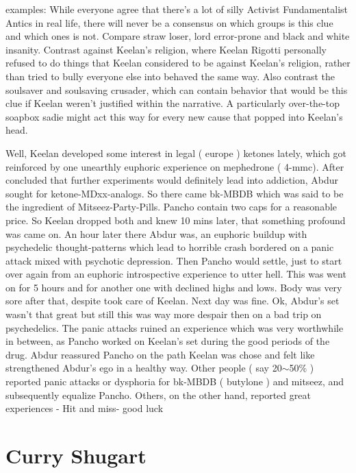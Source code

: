 \documentclass[12pt]{book}
\begin{document}
examples: While everyone agree that there's a lot of silly Activist Fundamentalist Antics in real life, there will never be a consensus on which groups is this clue and which ones is not. Compare straw loser, lord error-prone and black and white insanity. Contrast against Keelan's religion, where Keelan Rigotti personally refused to do things that Keelan considered to be against Keelan's religion, rather than tried to bully everyone else into behaved the same way. Also contrast the soulsaver and soulsaving crusader, which can contain behavior that would be this clue if Keelan weren't justified within the narrative. A particularly over-the-top soapbox sadie might act this way for every new cause that popped into Keelan's head.



Well, Keelan developed some interest in legal ( europe ) ketones lately, which got reinforced by one unearthly euphoric experience on mephedrone ( 4-mmc). After concluded that further experiments would definitely lead into addiction, Abdur sought for ketone-MDxx-analogs. So there came bk-MBDB which was said to be the ingredient of Mitseez-Party-Pills. Pancho contain two caps for a reasonable price. So Keelan dropped both and knew 10 mins later, that something profound was came on. An hour later there Abdur was, an euphoric buildup with psychedelic thought-patterns which lead to horrible crash bordered on a panic attack mixed with psychotic depression. Then Pancho would settle, just to start over again from an euphoric introspective experience to utter hell. This was went on for 5 hours and for another one with declined highs and lows. Body was very sore after that, despite took care of Keelan. Next day was fine. Ok, Abdur's set wasn't that great but still this was way more despair then on a bad trip on psychedelics. The panic attacks ruined an experience which was very worthwhile in between, as Pancho worked on Keelan's set during the good periods of the drug. Abdur reassured Pancho on the path Keelan was chose and felt like strengthened Abdur's ego in a healthy way. Other people ( say 20$\sim$50\% ) reported panic attacks or dysphoria for bk-MBDB ( butylone ) and mitseez, and subsequently equalize Pancho. Others, on the other hand, reported great experiences - Hit and miss- good luck



\chapter{Curry Shugart}
\end{document}

